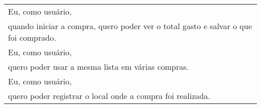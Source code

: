 \begin{quadro}[H]
{\begin{tabular}{|l|}
Eu, como usuário, \\ quando iniciar a compra, quero poder ver o total gasto e salvar o que foi comprado.                                         \\ \hline
Eu, como usuário, \\ quero poder usar a mesma lista em várias compras.                                                                           \\ \hline
Eu, como usuário, \\ quero poder registrar o local onde a compra foi realizada.                                                                  \\ \hline
\end{tabular}%
}
\label{historiasUsuario}
\end{quadro}
                                                               
